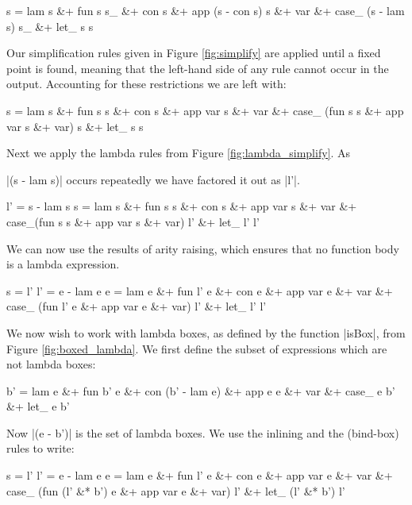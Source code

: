 \documentclass[preprint]{sigplanconf}
\begin{document}
\ignore\begin{code}
s  =  lam s &+ fun s s_ &+ con s &+ app (s - con s) s &+ var &+
      case_ (s - lam s) s_ &+ let_ s s
\end{code}

Our simplification rules given in Figure \ref{fig:simplify} are applied until a fixed point is found, meaning that the left-hand side of any rule cannot occur in the output. Accounting for these restrictions we are left with:

\ignore\begin{code}
s  =  lam s &+ fun s s &+ con s &+ app var s &+ var &+
      case_ (fun s s &+ app var s &+ var) s &+ let_ s s
\end{code}

Next we apply the lambda rules from Figure \ref{fig:lambda_simplify}. As \ignore|(s - lam s)| occurs repeatedly we have factored it out as |l'|.

\ignore\begin{code}
l'  =  s - lam s
s   =  lam s &+ fun s s &+ con s &+ app var s &+ var &+
       case_(fun s s &+ app var s &+ var) l' &+ let_ l' l'
\end{code}

We can now use the results of arity raising, which ensures that no function body is a lambda expression.

\ignore\begin{code}
s   =  l'
l'  =  e - lam e
e   =  lam e &+ fun l' e &+ con e &+ app var e &+ var &+
       case_ (fun l' e &+ app var e &+ var) l' &+ let_ l' l'
\end{code}

We now wish to work with lambda boxes, as defined by the function |isBox|, from Figure \ref{fig:boxed_lambda}. We first define the subset of expressions which are not lambda boxes:

\ignore\begin{code}
b'  =  lam e &+ fun b' e &+ con (b' - lam e) &+ app e e &+ var &+
        case_ e b' &+ let_ e b'
\end{code}

Now |(e - b')| is the set of lambda boxes. We use the inlining and the (bind-box) rules to write:

\ignore\begin{code}
s   = l'
l' = e - lam e
e =  lam e &+ fun l' e &+ con e &+ app var e &+ var &+
     case_ (fun (l' &* b') e &+ app var e &+ var) l' &+ let_ (l' &* b') l'
\end{code}
\end{document}
